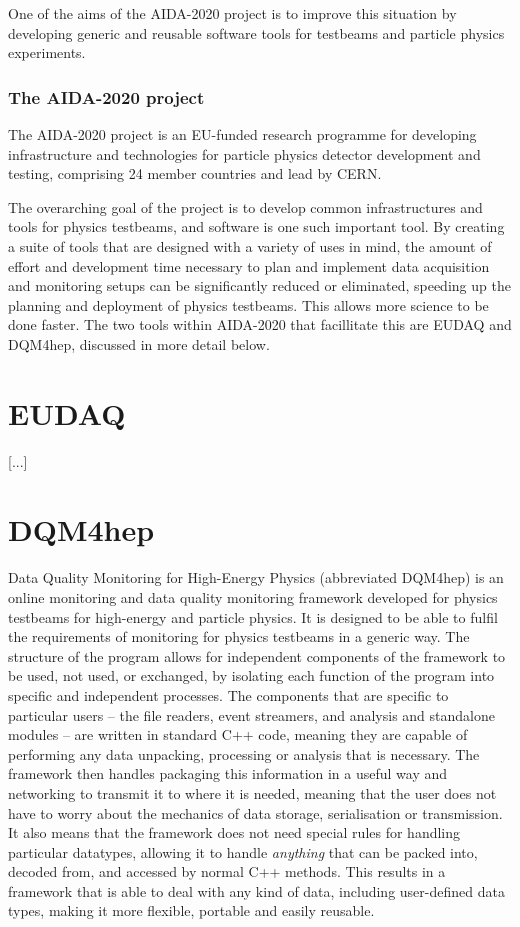 One of the aims of the AIDA-2020 project is to improve this situation by developing generic and reusable software tools for testbeams and particle physics experiments.

\subsubsection{The AIDA-2020 project}
The AIDA-2020 project is an EU-funded research programme for developing infrastructure and technologies for particle physics detector development and testing, comprising 24 member countries and lead by CERN.

The overarching goal of the project is to develop common infrastructures and tools for physics testbeams, and software is one such important tool. By creating a suite of tools that are designed with a variety of uses in mind, the amount of effort and development time necessary to plan and implement data acquisition and monitoring setups can be significantly reduced or eliminated, speeding up the planning and deployment of physics testbeams. This allows more science to be done faster. The two tools within AIDA-2020 that facillitate this are EUDAQ and DQM4hep, discussed in more detail below.

\section{EUDAQ}
[...]

\section{DQM4hep}
Data Quality Monitoring for High-Energy Physics (abbreviated DQM4hep) is an online monitoring and data quality monitoring framework developed for physics testbeams for high-energy and particle physics. It is designed to be able to fulfil the requirements of monitoring for physics testbeams in a generic way. The structure of the program allows for independent components of the framework to be used, not used, or exchanged, by isolating each function of the program into specific and independent processes. The components that are specific to particular users -- the file readers, event streamers, and analysis and standalone modules -- are written in standard C++ code, meaning they are capable of performing any data unpacking, processing or analysis that is necessary. The framework then handles packaging this information in a useful way and networking to transmit it to where it is needed, meaning that the user does not have to worry about the mechanics of data storage, serialisation or transmission. It also means that the framework does not need special rules for handling particular datatypes, allowing it to handle \emph{anything} that can be packed into, decoded from, and accessed by normal C++ methods. This results in a framework that is able to deal with any kind of data, including user-defined data types, making it more flexible, portable and easily reusable.

